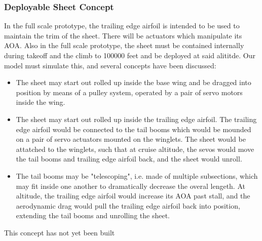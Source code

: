 \documentclass[12pt]{report} %
\begin{document}
\subsubsection{Deployable Sheet Concept}
In the full scale prototype, the trailing edge airfoil is intended to be used to maintain the trim of the sheet.  There will be actuators
which manipulate its AOA.  Also in the full scale prototype, the sheet must be contained internally during takeoff and the climb to
100000 feet and be deployed at said alititde.  Our model must simulate this, and several concepts have been discussed:
\begin{itemize}
  \item The sheet may start out rolled up inside the base wing and be dragged into position by means of a pulley system, operated by
a pair of servo motors inside the wing.
  \item The sheet may start out rolled up inside the trailing edge airfoil.  The trailing edge airfoil would be connected to the tail booms
which would be mounded on a pair of servo actuators mounted on the winglets.  The sheet would be attatched to the winglets, such that at
cruise altitude, the sevos would move the tail booms and trailing edge airfoil back, and the sheet would unroll.
  \item The tail booms may be "telescoping", i.e. made of multiple subsections, which may fit inside one another to dramatically decrease
the overal lengeth.  At altitude, the trailing edge airfoil would increase its AOA past stall, and the aerodynamic drag would pull the
trailing edge airfoil back into position, extending the tail booms and unrolling the sheet.
\end{itemize}

This concept has not yet been built
\end{document}
